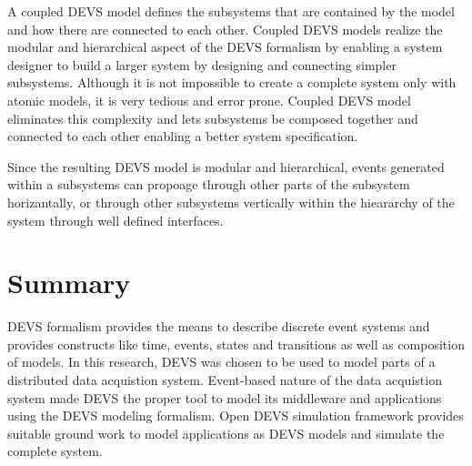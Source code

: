 A coupled DEVS model defines the subsystems that are contained by the model and how there are connected to each other. Coupled DEVS models realize the modular and hierarchical aspect of the DEVS formalism by enabling a system designer to build a larger system by designing and connecting simpler subsystems. Although it is not impossible to create a complete system only with atomic models, it is very tedious and error prone. Coupled DEVS model eliminates this complexity and lets subsystems be composed together and connected to each other enabling a better system specification.

Since the resulting DEVS model is modular and hierarchical, events generated within a subsystems can propoage through other parts of the subsystem horizantally, or through other subsystems vertically within the hieararchy of the system through well defined interfaces. 

\section{Summary}

DEVS formalism  provides the means to describe discrete event systems and provides constructs like time, events, states and transitions as well as composition of models. In this research, DEVS was chosen to be used to model parts of a distributed data acquistion system. Event-based nature of the data acquistion system made DEVS the proper tool to model its middleware and applications using the DEVS modeling formalism. Open DEVS simulation framework \cite{Devspp} provides suitable ground work to model applications as DEVS models and simulate the complete system.
